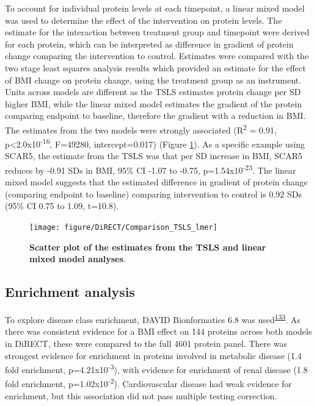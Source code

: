 \documentclass[11pt,twoside]{bristolthesis}
\begin{document}
To account for individual protein levels at each timepoint, a linear mixed model was used to determine the effect of the intervention on protein levels. The estimate for the interaction between treatment group and timepoint were derived for each protein, which can be interpreted as difference in gradient of protein change comparing the intervention to control. Estimates were compared with the two stage least squares analysis results which provided an estimate for the effect of BMI change on protein change, using the treatment group as an instrument. Units across models are different as the TSLS estimates protein change per SD higher BMI, while the linear mixed model estimates the gradient of the protein comparing endpoint to baseline, therefore the gradient with a reduction in BMI. The estimates from the two models were strongly associated (R\textsuperscript{2} = 0.91, p\textless2.0x10\textsuperscript{-16}, F=49280, intercept=0.017) (Figure \ref{fig:tsls-lmer}). As a specific example using SCAR5, the estimate from the TSLS was that per SD increase in BMI, SCAR5 reduces by -0.91 SDs in BMI, 95\% CI -1.07 to -0.75, p=1.54x10\textsuperscript{-23}. The linear mixed model suggests that the estimated difference in gradient of protein change (comparing endpoint to baseline) comparing intervention to control is 0.92 SDs (95\% CI 0.75 to 1.09, t=10.8).



\begin{figure}
\texttt{[image: figure/DiRECT/Comparison\_TSLS\_lmer]} \caption[Scatter plot of the estimates from the TSLS and linear mixed model analyses]{\textbf{Scatter plot of the estimates from the TSLS and linear mixed model analyses}.}\label{fig:tsls-lmer}
\end{figure}
\hypertarget{enrichment-analysis-1}{%
\subsection{Enrichment analysis}\label{enrichment-analysis-1}}

To explore disease class enrichment, DAVID Bionformatics 6.8 was used\textsuperscript{\protect\hyperlink{ref-Huang2009}{133}}. As there was consistent evidence for a BMI effect on 144 proteins across both models in DiRECT, these were compared to the full 4601 protein panel. There was strongest evidence for enrichment in proteins involved in metabolic disease (1.4 fold enrichment, p=4.21x10\textsuperscript{-3}), with evidence for enrichment of renal disease (1.8 fold enrichment, p=1.02x10\textsuperscript{-2}). Cardiovascular disease had weak evidence for enrichment, but this association did not pass multiple testing correction.
\end{document}
